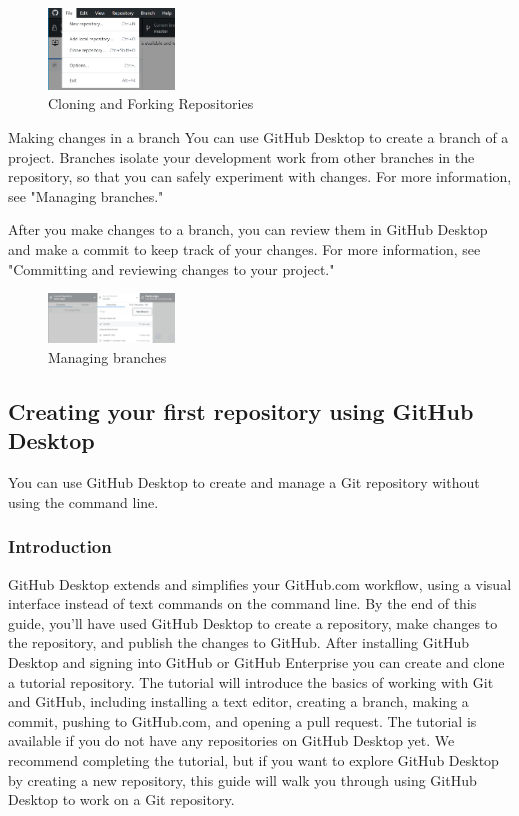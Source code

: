 \begin{figure}[ht]
    \centering
    \includegraphics[width=0.3\textwidth]{figures/Cloning and Forking Repositories from GitHub Desktop.png}
    \caption{Cloning and Forking Repositories }
\end{figure}

Making changes in a branch
You can use GitHub Desktop to create a branch of a project. Branches isolate your development work from other branches in the repository, so that you can safely experiment with changes. For more information, see "Managing branches."
 
After you make changes to a branch, you can review them in GitHub Desktop and make a commit to keep track of your changes. For more information, see "Committing and reviewing changes to your project."

\begin{figure}[ht]
    \centering
    \includegraphics[width=0.3\textwidth]{figures/Managing branches.png}
    \caption{Managing branches}
\end{figure}









\subsection{ Creating your first repository using GitHub Desktop }
You can use GitHub Desktop to create and manage a Git repository without using the command line.

\subsubsection{ Introduction}
GitHub Desktop extends and simplifies your GitHub.com workflow, using a visual interface instead of text commands on the command line. By the end of this guide, you'll have used GitHub Desktop to create a repository, make changes to the repository, and publish the changes to GitHub.
After installing GitHub Desktop and signing into GitHub or GitHub Enterprise you can create and clone a tutorial repository. The tutorial will introduce the basics of working with Git and GitHub, including installing a text editor, creating a branch, making a commit, pushing to GitHub.com, and opening a pull request. The tutorial is available if you do not have any repositories on GitHub Desktop yet.
We recommend completing the tutorial, but if you want to explore GitHub Desktop by creating a new repository, this guide will walk you through using GitHub Desktop to work on a Git repository.

